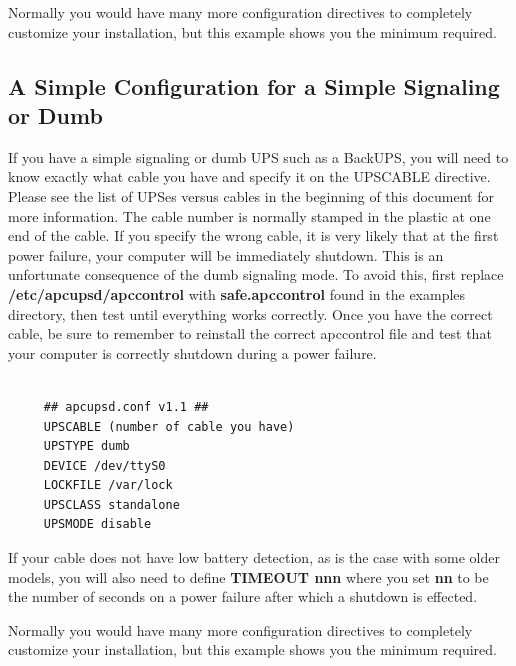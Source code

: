 Normally you would have many more configuration directives to completely
customize your installation, but this example shows you the minimum required. 

\label{A-Simple-Configuration-for-a-Simple-Signaling-or-Dumb}

\subsection*{A Simple Configuration for a Simple Signaling or Dumb}

\label{index-Configuration_002c-dumb-71}
\label{index-dumb_002c-configuration-72}
\label{index-Example_002c-dumb-conf-73}
If you have a simple signaling or dumb UPS such as a BackUPS, you will need to
know exactly what cable you have and specify it on the UPSCABLE directive.
Please see the list of UPSes versus cables in the beginning of this document
for more information. The cable number is normally stamped in the plastic at
one end of the cable. If you specify the wrong cable, it is very likely that
at the first power failure, your computer will be immediately shutdown. This
is an unfortunate consequence of the dumb signaling mode.  To avoid this,
first replace {\bf /etc/apcupsd/apccontrol} with {\bf safe.apccontrol} found
in the examples directory, then test until everything works correctly. Once
you have the correct cable, be sure to remember to reinstall the correct
apccontrol file and test that your computer is correctly shutdown during a
power failure. 

\footnotesize
\begin{verbatim}
     
     ## apcupsd.conf v1.1 ##
     UPSCABLE (number of cable you have)
     UPSTYPE dumb
     DEVICE /dev/ttyS0
     LOCKFILE /var/lock
     UPSCLASS standalone
     UPSMODE disable
\end{verbatim}
\normalsize

If your cable does not have low battery detection, as is the case with some
older models, you will also need to define {\bf TIMEOUT nnn} where you set
{\bf nn} to be the number of seconds on a power failure after which a shutdown
is effected.  

Normally you would have many more configuration directives to completely
customize your installation, but this example shows you the minimum required. 

